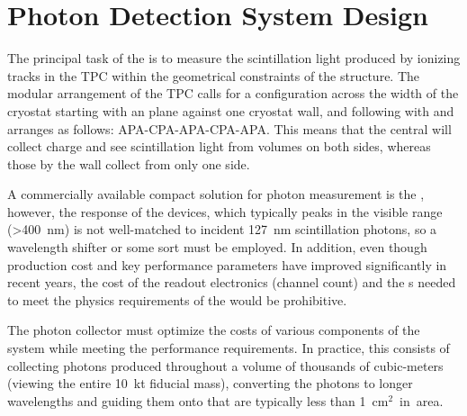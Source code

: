 \section{Photon Detection System Design}
\label{sec:fdsp-pd-design}



The principal task of the   is to measure the  scintillation light produced by ionizing tracks in the TPC within the geometrical constraints of the  structure. 
The modular arrangement of the  TPC calls for a configuration across the width of the cryostat starting with an  plane against one cryostat wall, and following with  and  arranges as follows:  APA-CPA-APA-CPA-APA. This means that the central  will collect charge and see scintillation light from \lar volumes on both sides, whereas those by the wall collect from only one side. 

A commercially available compact solution for photon measurement is the , however, the response of the devices, which typically peaks in the visible range (>\SI{400}{nm}) is not well-matched to incident \SI{127}{nm} scintillation photons, so a wavelength shifter or some sort must be employed. 
In addition, even though production cost and key performance parameters have improved significantly in recent years, the cost of the readout electronics (channel count) and the s needed to meet the physics requirements of the  would be prohibitive. 

The photon collector must optimize the costs of various components of the system while meeting the performance requirements.  In practice, this consists of collecting  photons produced throughout a volume of thousands of cubic-meters (viewing the entire \SI{10}{kt} \lar fiducial mass), converting the photons to longer wavelengths and guiding them onto  that are typically less than \SI{1}{cm$^2$} in area. 

